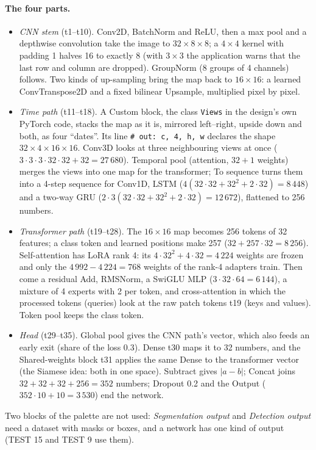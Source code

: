 \paragraph{The four parts.}
\begin{itemize}[nosep]
  \item \emph{CNN stem} (t1--t10). Conv2D, BatchNorm and ReLU, then a max pool and a depthwise convolution take the image to
        $32\times8\times8$; a $4\times4$ kernel with padding 1 halves 16 to exactly 8 (with $3\times3$ the application warns that the
        last row and column are dropped). GroupNorm (8 groups of 4 channels) follows. Two kinds of up-sampling bring the map back to
        $16\times16$: a learned ConvTranspose2D and a fixed bilinear Upsample, multiplied pixel by pixel.
  \item \emph{Time path} (t11--t18). A Custom block, the class \texttt{Views} in the design's own PyTorch code, stacks the map as
        it is, mirrored left--right, upside down and both, as four ``dates''. Its line \texttt{\# out: c, 4, h, w} declares the shape
        $32\times4\times16\times16$. Conv3D looks at three neighbouring views at once ($3\cdot3\cdot3\cdot32\cdot32+32=27\,680$).
        Temporal pool (attention, $32+1$ weights) merges the views into one map for the transformer; To sequence turns them into a
        4-step sequence for Conv1D, LSTM ($4(32\cdot32+32^2+2\cdot32)=8\,448$) and a two-way GRU ($2\cdot3(32\cdot32+32^2+2\cdot32)=12\,672$),
        flattened to 256 numbers.
  \item \emph{Transformer path} (t19--t28). The $16\times16$ map becomes 256 tokens of 32 features; a class token and learned
        positions make 257 ($32+257\cdot32=8\,256$). Self-attention has LoRA rank 4: its $4\cdot32^2+4\cdot32=4\,224$ weights are
        frozen and only the $4\,992-4\,224=768$ weights of the rank-4 adapters train. Then come a residual Add, RMSNorm, a SwiGLU MLP ($3\cdot32\cdot64=6\,144$),
        a mixture of 4 experts with 2 per token, and cross-attention in which the processed tokens (queries) look at the raw patch
        tokens t19 (keys and values). Token pool keeps the class token.
  \item \emph{Head} (t29--t35). Global pool gives the CNN path's vector, which also feeds an early exit (share of the loss 0.3). Dense
        t30 maps it to 32 numbers, and the Shared-weights block t31 applies the same Dense to the transformer vector (the Siamese idea:
        both in one space). Subtract gives $|a-b|$; Concat joins $32+32+32+256=352$ numbers; Dropout 0.2 and the Output
        ($352\cdot10+10=3\,530$) end the network.
\end{itemize}
Two blocks of the palette are not used: \emph{Segmentation output} and \emph{Detection output} need a dataset with masks or boxes, and a
network has one kind of output (TEST 15 and TEST 9 use them).

